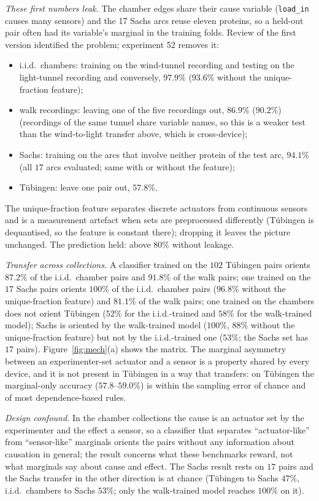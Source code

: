 \emph{These first numbers leak.} The chamber edges share their cause variable (\texttt{load\_in} causes many sensors) and the 17 Sachs arcs reuse eleven proteins, so a held-out pair often had its variable's marginal in the training folds. Review of the first version identified the problem; experiment 52 removes it:
\begin{itemize}
\item i.i.d.\ chambers: training on the wind-tunnel recording and testing on the light-tunnel recording and conversely, $97.9\%$ ($93.6\%$ without the unique-fraction feature);
\item walk recordings: leaving one of the five recordings out, $86.9\%$ ($90.2\%$) (recordings of the same tunnel share variable names, so this is a weaker test than the wind-to-light transfer above, which is cross-device);
\item Sachs: training on the arcs that involve neither protein of the test arc, $94.1\%$ (all $17$ arcs evaluated; same with or without the feature);
\item T\"ubingen: leave one pair out, $57.8\%$.
\end{itemize}
The unique-fraction feature separates discrete actuators from continuous sensors and is a measurement artefact when sets are preprocessed differently (T\"ubingen is dequantised, so the feature is constant there); dropping it leaves the picture unchanged. The prediction held: above $80\%$ without leakage.



\emph{Transfer across collections.} A classifier trained on the $102$ T\"ubingen pairs orients $87.2\%$ of the i.i.d.\ chamber pairs and $91.8\%$ of the walk pairs; one trained on the $17$ Sachs pairs orients $100\%$ of the i.i.d.\ chamber pairs ($96.8\%$ without the unique-fraction feature) and $81.1\%$ of the walk pairs; one trained on the chambers does not orient T\"ubingen ($52\%$ for the i.i.d.-trained and $58\%$ for the walk-trained model); Sachs is oriented by the walk-trained model ($100\%$, $88\%$ without the unique-fraction feature) but not by the i.i.d.-trained one ($53\%$; the Sachs set has $17$ pairs). Figure~\ref{fig:mech}(a) shows the matrix. The marginal asymmetry between an experimenter-set actuator and a sensor is a property shared by every device, and it is not present in T\"ubingen in a way that transfers: on T\"ubingen the marginal-only accuracy ($57.8$--$59.0\%$) is within the sampling error of chance and of most dependence-based rules.

\emph{Design confound.} In the chamber collections the cause is an actuator set by the experimenter and the effect a sensor, so a classifier that separates ``actuator-like'' from ``sensor-like'' marginals orients the pairs without any information about causation in general; the result concerns what these benchmarks reward, not what marginals say about cause and effect. The Sachs result rests on $17$ pairs and the Sachs transfer in the other direction is at chance (T\"ubingen to Sachs $47\%$, i.i.d.\ chambers to Sachs $53\%$; only the walk-trained model reaches $100\%$ on it).

